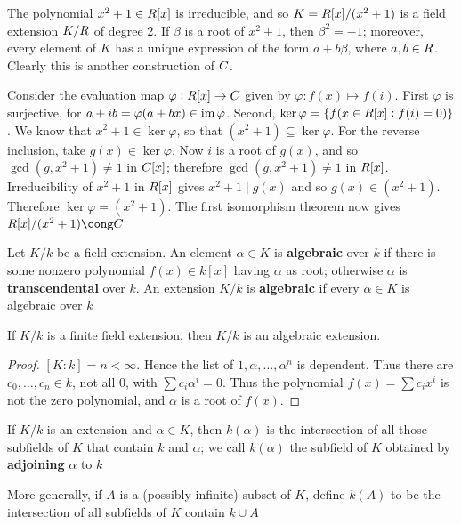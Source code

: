 \documentclass[11pt]{article}
\begin{document}
\begin{examplle}[]
The polynomial \(x^2+1\in\relax{R}[x]\) is irreducible, and so \(K=\relax{R}[x]/(x^2+1)\)
is a field extension \(K/\relax{R}\) of degree 2. If \(\beta\) is a root of \(x^2+1\), then 
\(\beta^2=-1\); moreover, every element of \(K\) has a unique expression of the
form \(a+b\beta\), where \(a,b\in\relax{R}\). Clearly this is another construction
of \(\relax{C}\).

Consider the evaluation map \(\varphi:\relax{R}[x]\to\relax{C}\) given by 
\(\varphi:f(x)\mapsto f(i)\). First \(\varphi\) is surjective, for
\(a+ib=\varphi(a+bx)\in\operatorname{im}\varphi\). Second,
\(\ker\varphi=\{f(x\in\relax{R}[x]:f(i)=0)\}\). We know that
\(x^2+1\in\ker\varphi\), so that \((x^2+1)\subseteq\ker\varphi\). For the
reverse inclusion, take \(g(x)\in\ker\varphi\). Now \(i\) is a root of \(g(x)\),
and so \(\gcd(g,x^2+1)\neq1\) in \(\relax{C}[x]\); therefore \(\gcd(g,x^2+1)\neq1\)
in \(\relax{R}[x]\). Irreducibility of \(x^2+1\) in \(\relax{R}[x]\) gives \(x^2+1\mid g(x)\)
and so \(g(x)\in(x^2+1)\). Therefore \(\ker\varphi=(x^2+1)\). The first
isomorphism theorem now gives \(\R[x]/(x^2+1)\cong\C\)
\end{examplle}

\begin{definition}[]
Let \(K/k\) be a field extension. An element \(\alpha\in K\) is \textbf{algebraic}
over \(k\) if there is some nonzero polynomial \(f(x)\in k[x]\) having \(\alpha\) as
root; otherwise \(\alpha\) is \textbf{transcendental} over \(k\). An extension \(K/k\) is
\textbf{algebraic} if every \(\alpha\in K\) is algebraic over \(k\)
\end{definition}

\begin{proposition}[]
If \(K/k\) is a finite field extension, then \(K/k\) is an algebraic
extension.
\end{proposition}

\begin{proof}
\([K:k]=n<\infty\). Hence the list of \(1,\alpha,\dots,\alpha^n\) is dependent. Thus
there are \(c_0,\dots,c_n\in k\), not all 0, with \(\sum c_i\alpha^i=0\). Thus
the polynomial \(f(x)=\sum c_ix^i\) is not the zero polynomial, and \(\alpha\) is a root
of \(f(x)\).
\end{proof}

\begin{definition}[]
If \(K/k\) is an extension and \(\alpha\in K\), then \(k(\alpha)\) is the
intersection of all those subfields of \(K\) that contain \(k\) and \(\alpha\); we call
\(k(\alpha)\) the subfield of \(K\) obtained by \textbf{adjoining} \(\alpha\) to \(k\)

More generally, if \(A\) is a (possibly infinite) subset of \(K\), define \(k(A)\)
to be the intersection of all subfields of \(K\) contain \(k\cup A\)
\end{definition}
\end{document}
